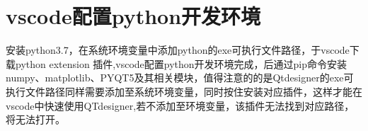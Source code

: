\documentclass{zjureport}
\begin{document}
\section{vscode配置python开发环境}
	安装python3.7，在系统环境变量中添加python的exe可执行文件路径，于vscode下载python extension 插件,vscode配置python开发环境完成，后通过pip命令安装numpy、matplotlib、PYQT5及其相关模块，值得注意的的是Qtdesigner的exe可执行文件路径同样需要添加至系统环境变量，同时按住安装对应插件，这样才能在vscode中快速使用QTdesigner,若不添加至环境变量，该插件无法找到对应路径，将无法打开。
	\begin{figure}[htbp]
		\centering
	\end{figure}
\end{document}
